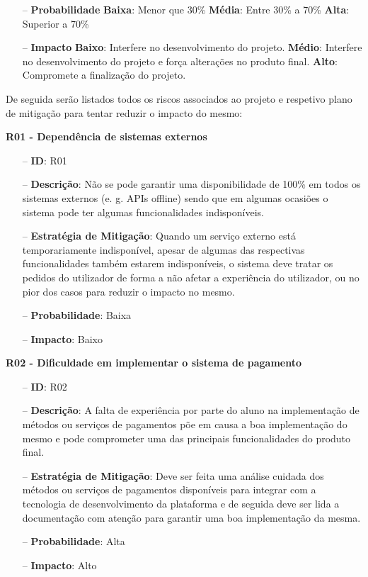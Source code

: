 \begin{itemize}
	\item[--] \textbf{Probabilidade}
	\subitem \textbf{Baixa}: Menor que 30\%
	\subitem \textbf{Média}: Entre 30\% a 70\%
	\subitem \textbf{Alta}: Superior a 70\%
	\item[--] \textbf{Impacto}
	\subitem \textbf{Baixo}: Interfere no desenvolvimento do projeto.
	\subitem \textbf{Médio}: Interfere no desenvolvimento do projeto e força alterações no produto final.
	\subitem \textbf{Alto}: Compromete a finalização do projeto.
\end{itemize}

De seguida serão listados todos os riscos associados ao projeto e respetivo plano de mitigação para tentar reduzir o impacto do mesmo:

\textbf{R01 - Dependência de sistemas externos}
\begin{itemize}
	\item[--] \textbf{ID}: R01
	\item[--] \textbf{Descrição}: Não se pode garantir uma disponibilidade de 100\% em todos os sistemas externos (e. g. APIs offline) sendo que em algumas ocasiões o sistema pode ter algumas funcionalidades indisponíveis.
	\item[--] \textbf{Estratégia de Mitigação}: Quando um serviço externo está temporariamente indisponível, apesar de algumas das respectivas funcionalidades também estarem indisponíveis, o sistema deve tratar os pedidos do utilizador de forma a não afetar a experiência do utilizador, ou no pior dos casos para reduzir o impacto no mesmo.
	\item[--] \textbf{Probabilidade}: Baixa
	\item[--] \textbf{Impacto}: Baixo
\end{itemize}

\textbf{R02 - Dificuldade em implementar o sistema de pagamento}
\begin{itemize}
	\item[--] \textbf{ID}: R02
	\item[--] \textbf{Descrição}: A falta de experiência por parte do aluno na implementação de métodos ou serviços de pagamentos põe em causa a boa implementação do mesmo e pode comprometer uma das principais funcionalidades do produto final.
	\item[--] \textbf{Estratégia de Mitigação}: Deve ser feita uma análise cuidada dos métodos ou serviços de pagamentos disponíveis para integrar com a tecnologia de desenvolvimento da plataforma e de seguida deve ser lida a documentação com atenção para garantir uma boa implementação da mesma.
	\item[--] \textbf{Probabilidade}: Alta
	\item[--] \textbf{Impacto}: Alto
\end{itemize}

